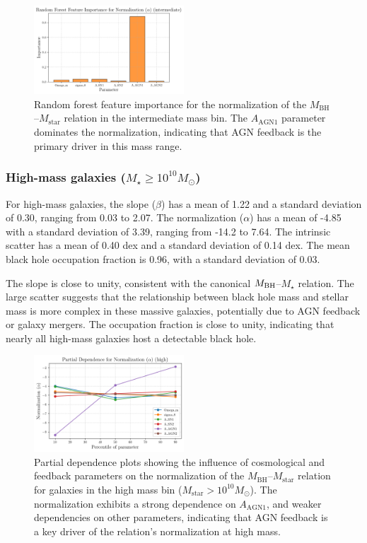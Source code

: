 \documentclass[twocolumn]{aastex631}
\begin{document}
\begin{figure}[ht!]
    \centering
    \includegraphics[width=0.5\textwidth]{plots/featimp_RandomForest_Normalization_alpha_intermediate_72_20250423_182559.png}
    \caption{Random forest feature importance for the normalization of the $M_\mathrm{BH}$--$M_\mathrm{star}$ relation in the intermediate mass bin. The $A_\mathrm{AGN1}$ parameter dominates the normalization, indicating that AGN feedback is the primary driver in this mass range.
}
    \label{fig:featimp_norm_random_intermediate}
\end{figure}

\subsubsection{High-mass galaxies ($M_{\star} \geq 10^{10} M_{\odot}$)}

For high-mass galaxies, the slope ($\beta$) has a mean of 1.22 and a standard deviation of 0.30, ranging from 0.03 to 2.07. The normalization ($\alpha$) has a mean of -4.85 with a standard deviation of 3.39, ranging from -14.2 to 7.64. The intrinsic scatter has a mean of 0.40 dex and a standard deviation of 0.14 dex. The mean black hole occupation fraction is 0.96, with a standard deviation of 0.03.

The slope is close to unity, consistent with the canonical $M_{\rm BH}$--$M_{\star}$ relation. The large scatter suggests that the relationship between black hole mass and stellar mass is more complex in these massive galaxies, potentially due to AGN feedback or galaxy mergers. The occupation fraction is close to unity, indicating that nearly all high-mass galaxies host a detectable black hole.

\begin{figure}[ht!]
    \centering
    \includegraphics[width=0.5\textwidth]{plots/pdp_Normalization_alpha_high_116_20250423_182620.png}
    \caption{Partial dependence plots showing the influence of cosmological and feedback parameters on the normalization of the $M_\mathrm{BH}$--$M_\mathrm{star}$ relation for galaxies in the high mass bin ($M_\mathrm{star} > 10^{10} M_\odot$). The normalization exhibits a strong dependence on $A_\mathrm{AGN1}$, and weaker dependencies on other parameters, indicating that AGN feedback is a key driver of the relation's normalization at high mass.
}
    \label{fig:pdp_norm_high}
\end{figure}
\end{document}
